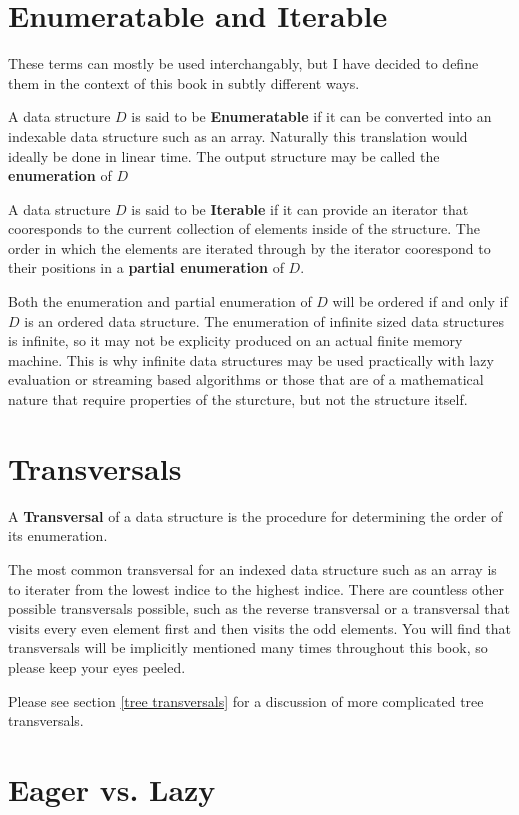 \documentclass[12pt, letterpaper]{book}
\begin{document}
\section{Enumeratable and Iterable}

These terms can mostly be used interchangably, but I have decided to define them in the context of this book in subtly different ways.

A data structure $D$ is said to be \textbf{Enumeratable} if it can be converted into an indexable data structure such as an array. Naturally this translation would ideally be done in linear time. The output structure may be called the \textbf{enumeration} of $D$

A data structure $D$ is said to be \textbf{Iterable} if it can provide an iterator that cooresponds to the current collection of elements inside of the structure. The order in which the elements are iterated through by the iterator coorespond to their positions in a \textbf{partial enumeration} of $D$.

Both the enumeration and partial enumeration of $D$ will be ordered if and only if $D$ is an ordered data structure. The enumeration of infinite sized data structures is infinite, so it may not be explicity produced on an actual finite memory machine. This is why infinite data structures may be used practically with lazy evaluation or streaming based algorithms or those that are of a mathematical nature that require properties of the sturcture, but not the structure itself. 

\section{Transversals}

A \textbf{Transversal} of a data structure is the procedure for determining the order of its enumeration.

The most common transversal for an indexed data structure such as an array is to iterater from the lowest indice to the highest indice. There are countless other possible transversals possible, such as the reverse transversal or a transversal that visits every even element first and then visits the odd elements. You will find that transversals will be implicitly mentioned many times throughout this book, so please keep your eyes peeled.

Please see section \ref{tree transversals} for a discussion of more complicated tree transversals.

\section{Eager vs. Lazy}
\end{document}
